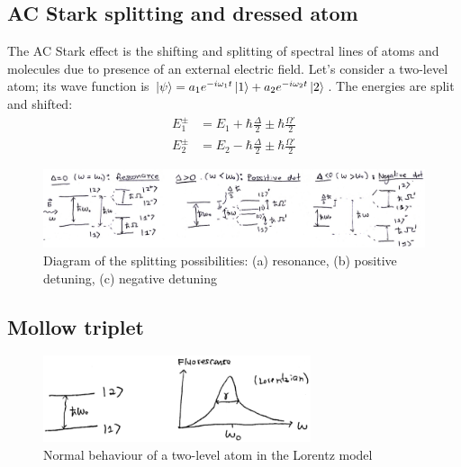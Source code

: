\subsection{AC Stark splitting and dressed atom}
The AC Stark effect is the shifting and splitting of spectral lines of atoms and molecules due to presence of an external electric field. Let's consider a two-level atom; its wave function is $\ket{\psi} = a_{1} e^{-i \omega_{1} t} \ket{1} + a_{2} e^{-i \omega_{2} t} \ket{2}$. The energies are split and shifted:
\begin{subequations}
\begin{align}
	E_{1}^{\pm} &= E_{1} + \hbar \frac{\Delta}{2} \pm \hbar \frac{\Omega'}{2} \\
	E_{2}^{\pm} &= E_{2} - \hbar \frac{\Delta}{2} \pm \hbar \frac{\Omega'}{2}
\end{align}
\end{subequations}

\begin{figure}[H]
	\centering
	\includegraphics[width=\textwidth]{./images/3-ac-stark-splitting}
	\caption{Diagram of the splitting possibilities: (a) resonance, (b) positive detuning, (c) negative detuning}
	\label{fig:ac-stark-splitting}
\end{figure}

\subsection{Mollow triplet}
\begin{figure}[H]
	\centering
	\includegraphics[width=0.7\textwidth]{./images/3-mollow-triplet-pre}
	\caption{Normal behaviour of a two-level atom in the Lorentz model}
	\label{fig:mollow-triplet-pre}
\end{figure}

